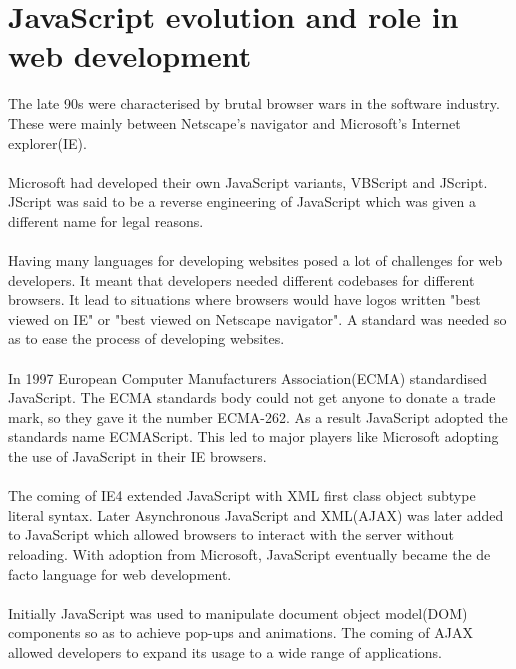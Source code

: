 \section{JavaScript evolution and role in web development}
The late 90s were characterised by brutal browser wars in the software industry\cite{wars}. These were mainly between Netscape's navigator and Microsoft's Internet explorer(IE).
\paragraph{}
Microsoft had developed their own JavaScript variants, VBScript and JScript. JScript was said to be a reverse engineering of JavaScript which was given a different name for legal reasons.
\paragraph{}
Having many languages for developing websites posed a lot of challenges for web developers. It meant that developers needed different codebases for different browsers. It lead to situations where browsers would have logos written "best viewed on IE" or "best viewed on Netscape navigator". A standard was needed so as to ease the process of developing websites.
\paragraph{}
In 1997 European Computer Manufacturers Association(ECMA) standardised JavaScript. The ECMA standards body could not get anyone to donate a trade mark, so they gave it the number ECMA-262. As a result JavaScript adopted the standards name ECMAScript. This led to major players like Microsoft adopting the use of JavaScript in their IE browsers.
\paragraph{}
The coming of IE4 extended JavaScript with XML first class object subtype literal syntax\cite{Eich:2005:JTY:1090189.1086382}. Later Asynchronous JavaScript and XML(AJAX) was later added to JavaScript which allowed browsers to interact with the server without reloading. With adoption from Microsoft, JavaScript eventually became the de facto language for web development.
\paragraph{}
Initially JavaScript was used to manipulate document object model(DOM) components so as to achieve pop-ups and animations. The coming of AJAX allowed developers to expand its usage to a wide range of applications.
